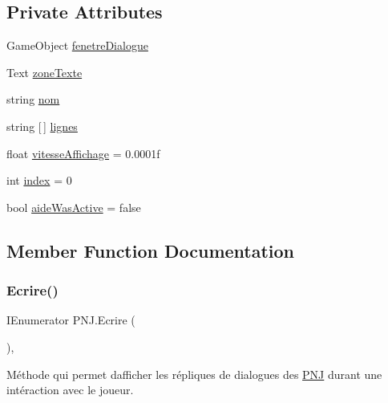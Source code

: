 \subsection*{Private Attributes}
\begin{DoxyCompactItemize}
\item 
Game\+Object \mbox{\hyperlink{class_p_n_j_a65a209525dc2d601bfeeaab76b770d51}{fenetre\+Dialogue}}
\item 
Text \mbox{\hyperlink{class_p_n_j_adb5494c77012b75c00b3d7598588a67f}{zone\+Texte}}
\item 
string \mbox{\hyperlink{class_p_n_j_a93fb35f7f29355e2c23b951d7b2e0dc0}{nom}}
\item 
string \mbox{[}$\,$\mbox{]} \mbox{\hyperlink{class_p_n_j_aeffd150ca229e21cecbacba72f056c98}{lignes}}
\item 
float \mbox{\hyperlink{class_p_n_j_adb71316fd171c95bb50a17cc66057ea6}{vitesse\+Affichage}} = 0.\+0001f
\item 
int \mbox{\hyperlink{class_p_n_j_a812687a1e8b5e0c95deb1a7c5ffd30dd}{index}} = 0
\item 
bool \mbox{\hyperlink{class_p_n_j_ab86390338799614c76821168e15e82fa}{aide\+Was\+Active}} = false
\end{DoxyCompactItemize}


\subsection{Member Function Documentation}
\mbox{\label{class_p_n_j_a7e3c67f92110c15a5820be1996492257}} 
\subsubsection{\texorpdfstring{Ecrire()}{Ecrire()}}
{\footnotesize\ttfamily I\+Enumerator P\+N\+J.\+Ecrire (\begin{DoxyParamCaption}{ }\end{DoxyParamCaption})\hspace{0.3cm}{\ttfamily [inline]}, {\ttfamily [private]}}

Méthode qui permet d\textquotesingle{}afficher les répliques de dialogues des \mbox{\hyperlink{class_p_n_j}{P\+NJ}} durant une intéraction avec le joueur. \mbox{\label{class_p_n_j_ae036e7118940aef5eb3759dcb7c38932}} 
